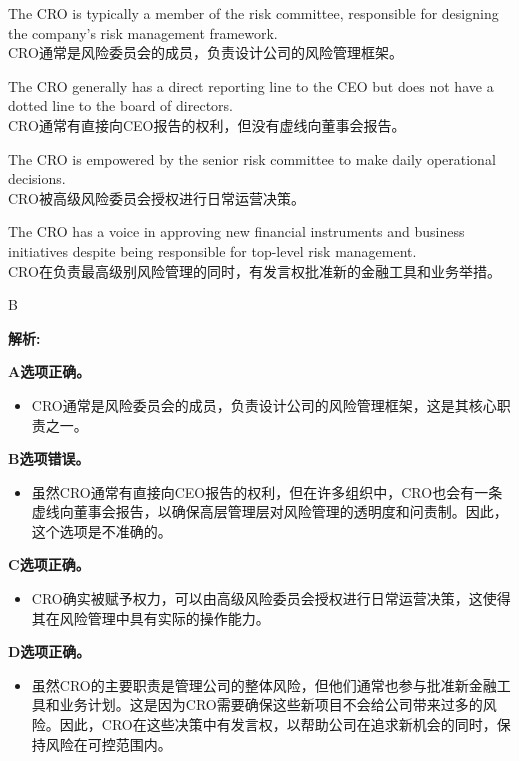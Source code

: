 \documentclass{article}
\newenvironment{explanation}
{\textbf{解析:}\par}
{\par}
\begin{document}
\begin{choices}
    \item The CRO is typically a member of the risk committee, responsible for designing the company's risk management framework. \\
    CRO通常是风险委员会的成员，负责设计公司的风险管理框架。
    \item The CRO generally has a direct reporting line to the CEO but does not have a dotted line to the board of directors. \\
    CRO通常有直接向CEO报告的权利，但没有虚线向董事会报告。
    \item The CRO is empowered by the senior risk committee to make daily operational decisions.\\
    CRO被高级风险委员会授权进行日常运营决策。
    \item The CRO has a voice in approving new financial instruments and business initiatives despite being responsible for top-level risk management. \\
    CRO在负责最高级别风险管理的同时，有发言权批准新的金融工具和业务举措。
\end{choices}


\begin{correctanswer}
    B
\end{correctanswer}

\begin{explanation}
    \textbf{A选项正确。}
    \begin{itemize}
        \item CRO通常是风险委员会的成员，负责设计公司的风险管理框架，这是其核心职责之一。
    \end{itemize}
    
    \textbf{B选项错误。}
    \begin{itemize}
        \item 虽然CRO通常有直接向CEO报告的权利，但在许多组织中，CRO也会有一条虚线向董事会报告，以确保高层管理层对风险管理的透明度和问责制。因此，这个选项是不准确的。
    \end{itemize}
    
    \textbf{C选项正确。}
    \begin{itemize}
        \item CRO确实被赋予权力，可以由高级风险委员会授权进行日常运营决策，这使得其在风险管理中具有实际的操作能力。
    \end{itemize}
    
    \textbf{D选项正确。}
    \begin{itemize}
        \item 虽然CRO的主要职责是管理公司的整体风险，但他们通常也参与批准新金融工具和业务计划。这是因为CRO需要确保这些新项目不会给公司带来过多的风险。因此，CRO在这些决策中有发言权，以帮助公司在追求新机会的同时，保持风险在可控范围内。
    \end{itemize}
\end{explanation}
\end{document}
